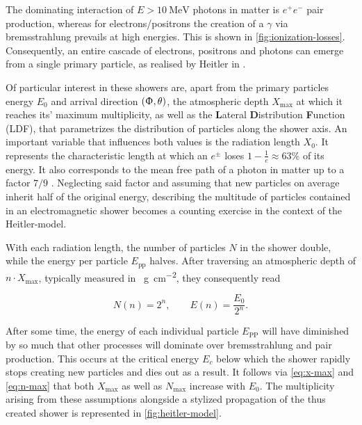 The dominating interaction of $E > \SI{10}{\mega\electronvolt}$ photons in matter is $e^+e^-$ pair production, whereas for electrons/positrons the creation of a
$\gamma$ via bremsstrahlung prevails at high energies. This is shown in \autoref{fig:ionization-losses}. Consequently, an entire cascade of electrons, positrons 
and photons can emerge from a single primary particle, as realised by Heitler in \cite{heitler1984quantum}. 

Of particular interest in these showers are, apart from the primary particles energy $E_0$ and arrival direction $(\Upphi, \theta)$, the atmospheric depth 
$X_\text{max}$ at which it reaches its' maximum multiplicity, as well as the \textbf{L}ateral \textbf{D}istribution \textbf{F}unction (LDF), that parametrizes the 
distribution of particles along the shower axis. An important variable that influences both values is the radiation length $X_0$. It represents the characteristic
length at which an $e^\pm$ loses $1-\frac{1}{e}\approx63\%$ of its energy. It also corresponds to the mean free path of a photon in matter up to a factor $7 / 9$ 
\cite{gupta2010calculation}. Neglecting said factor and assuming that new particles on average inherit half of the original energy, describing the multitude of 
particles contained in an electromagnetic shower becomes a counting exercise in the context of the Heitler-model.

With each radiation length, the number of particles $N$ in the shower double, while the energy per particle $E_\text{pp}$ halves. After traversing an atmospheric 
depth of $n\cdot X_\text{max}$, typically measured in \SI{}{\gram\per\centi\meter\squared}, they consequently read

\begin{equation}
\label{eq:heitler-parameters}
N(n) = 2^n, \qquad E(n) = \frac{E_0}{2^n}.
\end{equation}

After some time, the energy of each individual particle $E_\text{PP}$ will have diminished by so much that other processes will dominate over bremsstrahlung and 
pair production. This occurs at the critical energy $E_c$ below which the shower rapidly stops creating new particles and dies out as a result. It follows via 
\autoref{eq:x-max} and \ref{eq:n-max} that both $X_\text{max}$ as well as $N_\text{max}$ increase with $E_0$. The multiplicity arising from 
these assumptions alongside a stylized propagation of the thus created shower is represented in \autoref{fig:heitler-model}. 


